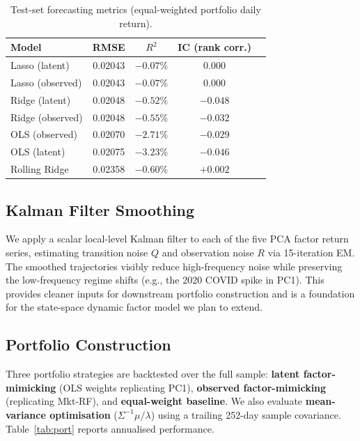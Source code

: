 \documentclass{article}
\begin{document}
\begin{table}[h]
\centering
\caption{Test-set forecasting metrics (equal-weighted portfolio daily return).}
\label{tab:forecast}
\begin{tabular}{lcccc}
\toprule
Model & RMSE & $R^2$ & IC (rank corr.) \\
\midrule
Lasso (latent)    & 0.02043 & $-0.07\%$ & 0.000 \\
Lasso (observed)  & 0.02043 & $-0.07\%$ & 0.000 \\
Ridge (latent)    & 0.02048 & $-0.52\%$ & $-0.048$ \\
Ridge (observed)  & 0.02048 & $-0.55\%$ & $-0.032$ \\
OLS (observed)    & 0.02070 & $-2.71\%$ & $-0.029$ \\
OLS (latent)      & 0.02075 & $-3.23\%$ & $-0.046$ \\
Rolling Ridge     & 0.02358 & $-0.60\%$ & $+0.002$ \\
\bottomrule
\end{tabular}
\end{table}

\subsection{Kalman Filter Smoothing}

We apply a scalar local-level Kalman filter to each of the five PCA factor return series,
estimating transition noise $Q$ and observation noise $R$ via 15-iteration EM. The smoothed
trajectories visibly reduce high-frequency noise while preserving the low-frequency regime shifts
(e.g., the 2020 COVID spike in PC1). This provides cleaner inputs for downstream portfolio
construction and is a foundation for the state-space dynamic factor model we plan to extend.

\subsection{Portfolio Construction}

Three portfolio strategies are backtested over the full sample:
\textbf{latent factor-mimicking} (OLS weights replicating PC1),
\textbf{observed factor-mimicking} (replicating Mkt-RF),
and \textbf{equal-weight baseline}.
We also evaluate \textbf{mean-variance optimisation} ($\Sigma^{-1}\mu / \lambda$) using a
trailing 252-day sample covariance. Table~\ref{tab:port} reports annualised performance.
\end{document}
